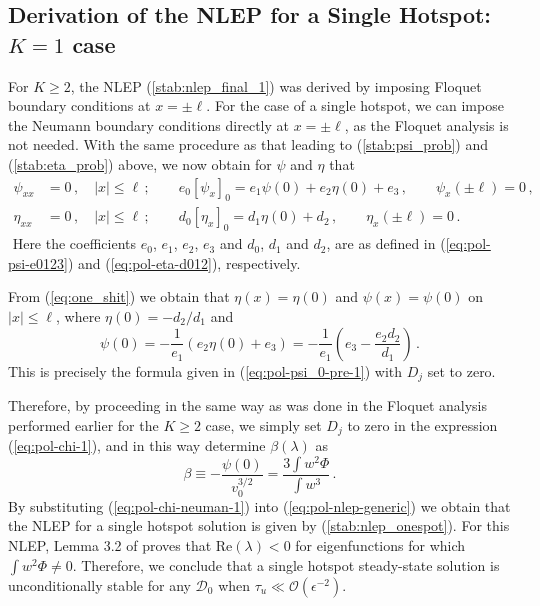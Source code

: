 \documentclass{article}%
\newcommand{\bsub}{\begin{subequations}}
\newcommand{\esub}{\end{subequations}$\!$}
\begin{document}
\subsection{Derivation of the NLEP for a Single Hotspot: $K=1$ case}
\label{stab:onespot} 

For $K\geq 2$, the NLEP (\ref{stab:nlep_final_1}) was derived by
imposing Floquet boundary conditions at $x=\pm \ell$. For the case of
a single hotspot, we can impose the Neumann boundary conditions
directly at $x=\pm \ell$, as the Floquet analysis is not needed. With
the same procedure as that leading to (\ref{stab:psi_prob}) and
(\ref{stab:eta_prob}) above, we now obtain for $\psi$ and $\eta$ that
\bsub \label{eq:one_shit}
\begin{align}
\psi_{xx}  &=  0\,, \quad|x|\leq\ell\,; \qquad
e_{0}\left[\psi_{x}\right]_{0}  =  e_{1}\psi(0)+e_{2}\eta(0)+e_{3}\,, \qquad
\psi_{x}(\pm\ell) =0\,, \label{eq:pol-psi-ode-neumann}\\
\eta_{xx}  &=  0\,, \quad |x|\leq\ell\,; \qquad
d_{0}\left[\eta_{x}\right]_{0}  =  d_{1}\eta(0)+d_{2}\,,
\qquad \eta_{x}(\pm\ell) =0 \,. \label{eq:pol-eta-ode-neumann}
\end{align}
\esub
Here the coefficients $e_{0}$, $e_{1}$, $e_{2}$, $e_{3}$ and $d_{0}$,
$d_{1}$ and $d_{2}$, are as defined in (\ref{eq:pol-psi-e0123}) and
(\ref{eq:pol-eta-d012}), respectively.

From (\ref{eq:one_shit}) we obtain that $\eta(x)=\eta(0)$ and
$\psi(x)=\psi(0)$ on $|x|\leq \ell$, where $\eta(0)=-d_{2}/d_{1}$ and
\begin{equation*}
\psi(0) = -\frac{1}{e_{1}}\left(e_{2}\eta(0)+e_{3}\right) =
-\frac{1}{e_{1}}\left(e_{3}-\frac{e_{2}d_{2}}{d_{1}}\right)\,.
\end{equation*}
This is precisely the formula given in (\ref{eq:pol-psi_0-pre-1}) with
$D_{j}$ set to zero.

Therefore, by proceeding in the same way as was done in the Floquet
analysis performed earlier for the $K\geq 2$ case, we simply set
$D_{j}$ to zero in the expression (\ref{eq:pol-chi-1}), and in this
way determine $\beta(\lambda)$ as
\begin{equation}
\beta \equiv-\frac{\psi(0)}{v_{0}^{3/2}}=\frac{3\int w^{2}\Phi}{\int w^{3}}\,. 
\label{eq:pol-chi-neuman-1}
\end{equation}
By substituting (\ref{eq:pol-chi-neuman-1}) into
(\ref{eq:pol-nlep-generic}) we obtain that the NLEP for a single
hotspot solution is given by (\ref{stab:nlep_onespot}). For this NLEP,
Lemma 3.2 of \cite{kww_crime} proves that $\mbox{Re}(\lambda)<0$ for
eigenfunctions for which $\int w^2\Phi\neq 0$.  Therefore, we conclude
that a single hotspot steady-state solution is unconditionally stable
for any ${\mathcal D}_{0}$ when $\tau_{u}\ll {\mathcal
  O}(\epsilon^{-2})$.
\end{document}
